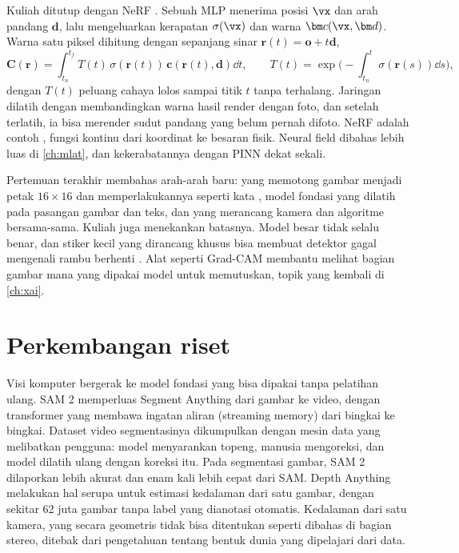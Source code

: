 Kuliah ditutup dengan NeRF \citep{mildenhall2020}. Sebuah MLP menerima posisi $\vx$ dan arah
pandang $\bm d$, lalu mengeluarkan kerapatan $\sigma(\vx)$ dan warna $\bm c(\vx,\bm d)$. Warna
satu piksel dihitung dengan  sepanjang sinar $\bm r(t)=\bm o+t\bm d$,
\begin{equation}
\bm C(\bm r)=\int_{t_n}^{t_f}T(t)\,\sigma(\bm r(t))\,\bm c(\bm r(t),\bm d)\dd t,\qquad
T(t)=\exp\Big(-\int_{t_n}^{t}\sigma(\bm r(s))\dd s\Big),
\end{equation}
dengan $T(t)$ peluang cahaya lolos sampai titik $t$ tanpa terhalang. Jaringan dilatih dengan
membandingkan warna hasil render dengan foto, dan setelah terlatih, ia bisa merender sudut pandang
yang belum pernah difoto. NeRF adalah contoh , fungsi kontinu dari koordinat ke
besaran fisik. Neural field dibahas lebih luas di \cref{ch:mlat}, dan kekerabatannya dengan PINN
dekat sekali.

Pertemuan terakhir membahas arah-arah baru:  yang memotong gambar menjadi
petak $16\times16$ dan memperlakukannya seperti kata \citep{dosovitskiy2021}, model fondasi yang
dilatih pada pasangan gambar dan teks, dan  yang merancang kamera dan
algoritme bersama-sama. Kuliah juga menekankan batasnya. Model besar tidak selalu benar, dan
stiker kecil yang dirancang khusus bisa membuat detektor gagal mengenali rambu berhenti
\citep{eykholt2018}. Alat seperti Grad-CAM \citep{selvaraju2017} membantu melihat bagian gambar
mana yang dipakai model untuk memutuskan, topik yang kembali di \cref{ch:xai}.

\section{Perkembangan riset}

Visi komputer bergerak ke model fondasi yang bisa dipakai tanpa pelatihan ulang. SAM 2 \citep{ravi2024} memperluas
Segment Anything dari gambar ke video, dengan transformer yang membawa ingatan aliran (streaming memory) dari bingkai ke
bingkai. Dataset video segmentasinya dikumpulkan dengan mesin data yang melibatkan pengguna: model menyarankan topeng,
manusia mengoreksi, dan model dilatih ulang dengan koreksi itu. Pada segmentasi gambar, SAM 2 dilaporkan lebih akurat
dan enam kali lebih cepat dari SAM. Depth Anything \citep{yang2024depth} melakukan hal serupa untuk estimasi kedalaman
dari satu gambar, dengan sekitar 62 juta gambar tanpa label yang dianotasi otomatis. Kedalaman dari satu kamera, yang
secara geometris tidak bisa ditentukan seperti dibahas di bagian stereo, ditebak dari pengetahuan tentang bentuk dunia
yang dipelajari dari data.


